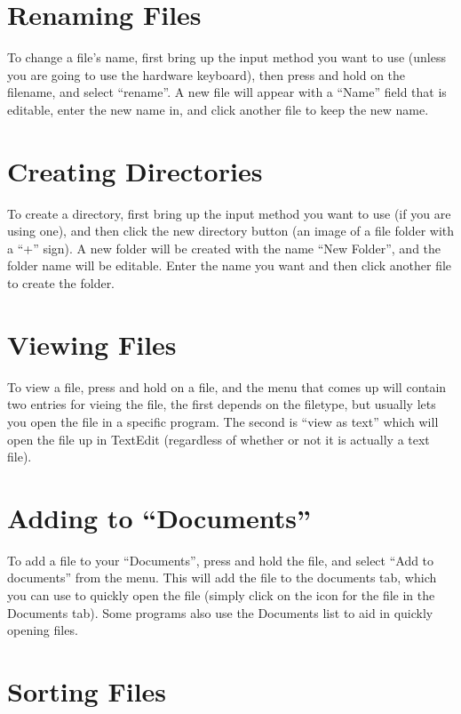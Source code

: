 \documentclass[12pt,letterpaper,oneside, openany]{book} \usepackage[latin1] {inputenc}
\begin{document}
\section{Renaming Files}

To change a file's name, first bring up the input method you want to use (unless you are going to use the hardware keyboard), then press and hold on the filename, and select ``rename''. A new file will appear with a ``Name'' field that is editable, enter the new name in, and click another file to keep the new name. 

\section{Creating Directories}

To create a directory, first bring up the input method you want to use (if you are using one), and then click the new directory button (an image of a file folder with a ``+'' sign). A new folder will be created with the name ``New Folder'', and the folder name will be editable. Enter the name you want and then click another file to create the folder. 

\section{Viewing Files}

To view a file, press and hold on a file, and the menu that comes up will contain two entries for vieing the file, the first depends on the filetype, but usually lets you open the file in a specific program. The second is ``view as text'' which will open the file up in TextEdit (regardless of whether or not it is actually a text file). 

\section{Adding to ``Documents''}
\label{docadd}
To add a file to your ``Documents'', press and hold the file, and select ``Add to documents'' from the menu. This will add the file to the documents tab, which you can use to quickly open the file (simply click on the icon for the file in the Documents tab). Some programs also use the Documents list to aid in quickly opening files. 


\section{Sorting Files}
\end{document}
